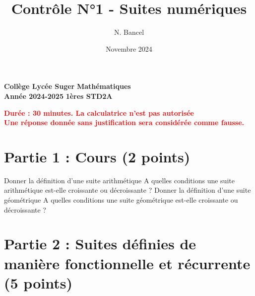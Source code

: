 \documentclass{exam}
\title{Contrôle N°1 - Suites numériques}
\author{N. Bancel}
\date{Novembre 2024}
\begin{document}
\textbf{Collège Lycée Suger}
\hfill
\textbf{Mathématiques} \\

\textbf{Année 2024-2025}
\hfill
\textbf{1ères STD2A} \par

{\let\newpage\relax\maketitle}

\begin{center}
\textbf{\textcolor{red}{Durée : 30 minutes. La calculatrice n'est pas autorisée}} \\
\textbf{\textcolor{red}{Une réponse donnée sans justification sera considérée comme fausse.}} \\
\end{center}

\section*{Partie 1 : Cours (2 points)}

\begin{questions}
  \question[0.5] Donner la définition d'une suite arithmétique
  \question[0.5] A quelles conditions une suite arithmétique est-elle croissante ou décroissante ?
  \question[0.5] Donner la définition d'une suite géométrique
  \question[0.5] A quelles conditions une suite géométrique est-elle croissante ou décroissante ?

\end{questions} 

\section*{Partie 2 : Suites définies de manière fonctionnelle et récurrente (5 points)}
\end{document}
